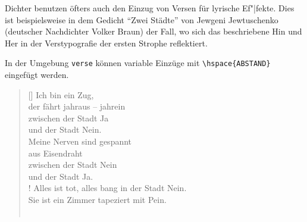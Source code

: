 Dichter benutzen öfters auch den Einzug von Versen für lyrische Ef"|fekte.
Dies ist beispielsweise in dem Gedicht "`Zwei Städte"' von Jewgeni Jewtuschenko
(deutscher Nachdichter Volker Braun) der Fall, wo sich das beschriebene 
Hin und Her in der Verstypografie der ersten Strophe reflektiert. 

In der Umgebung \texttt{verse} können variable Einzüge mit 
\verb|\hspace{ABSTAND}| eingefügt werden. 
\renewcommand{\poemtitlefont}{%
\normalfont\large\itshape\centering}


 \settowidth{\versewidth}{zwischen der Stadt Ja und zwischen der Stadt Nein}

\begin{verse}[\versewidth]
Ich bin ein Zug,\\
\hspace{2.3cm} der fährt jahraus -- jahrein\\
 zwischen der Stadt Ja\\
\hspace{3.2cm}                          und der Stadt Nein.\\
 Meine Nerven sind gespannt\\
\hspace{4.3cm}                            aus Eisendraht\\
 zwischen der Stadt Nein\\
 \hspace{3.7cm}  und der Stadt Ja.\\!
 Alles ist tot, alles bang in der Stadt Nein.\\
 Sie ist ein Zimmer tapeziert mit Pein.\\
 \relax [\ldots]\\
\end{verse}

